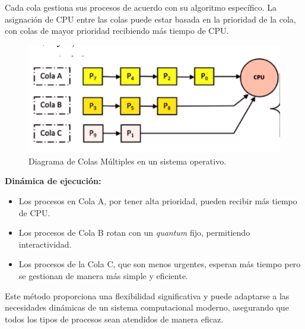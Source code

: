 Cada cola gestiona sus procesos de acuerdo con su algoritmo específico. La asignación de CPU entre las colas puede estar basada en la prioridad de la cola, con colas de mayor prioridad recibiendo más tiempo de CPU.

\begin{figure}[H]
	\centering
	\includegraphics[width=0.8\linewidth]{Imagenes/colas.png}
	\caption{Diagrama de Colas Múltiples en un sistema operativo.}
\end{figure}

\textbf{Dinámica de ejecución:}

\begin{itemize}
	\item Los procesos en Cola A, por tener alta prioridad, pueden recibir más tiempo de CPU. 
	\item Los procesos de Cola B rotan con un \textit{quantum} fijo, permitiendo interactividad.
	\item Los procesos de la Cola C, que son menos urgentes, esperan más tiempo pero se gestionan de manera más simple y eficiente.
\end{itemize}

Este método proporciona una flexibilidad significativa y puede adaptarse a las necesidades dinámicas de un sistema computacional moderno, asegurando que todos los tipos de procesos sean atendidos de manera eficaz.


